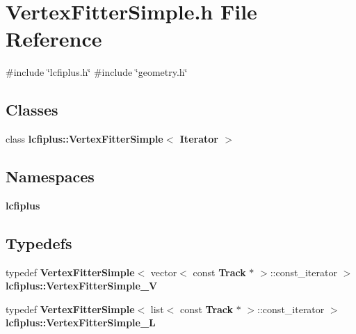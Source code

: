 \section{Vertex\+Fitter\+Simple.\+h File Reference}
\label{VertexFitterSimple_8h}
{\ttfamily \#include \char`\"{}lcfiplus.\+h\char`\"{}}\newline
{\ttfamily \#include \char`\"{}geometry.\+h\char`\"{}}\newline
\subsection*{Classes}
\begin{DoxyCompactItemize}
\item 
class \textbf{ lcfiplus\+::\+Vertex\+Fitter\+Simple$<$ Iterator $>$}
\end{DoxyCompactItemize}
\subsection*{Namespaces}
\begin{DoxyCompactItemize}
\item 
 \textbf{ lcfiplus}
\end{DoxyCompactItemize}
\subsection*{Typedefs}
\begin{DoxyCompactItemize}
\item 
typedef \textbf{ Vertex\+Fitter\+Simple}$<$ vector$<$ const \textbf{ Track} $\ast$ $>$\+::const\+\_\+iterator $>$ \textbf{ lcfiplus\+::\+Vertex\+Fitter\+Simple\+\_\+V}
\item 
typedef \textbf{ Vertex\+Fitter\+Simple}$<$ list$<$ const \textbf{ Track} $\ast$ $>$\+::const\+\_\+iterator $>$ \textbf{ lcfiplus\+::\+Vertex\+Fitter\+Simple\+\_\+L}
\end{DoxyCompactItemize}
